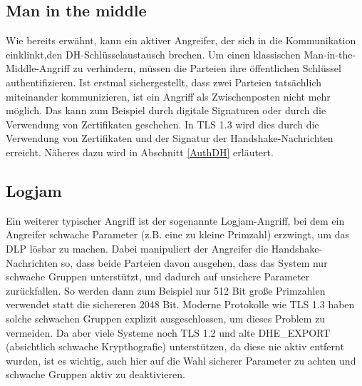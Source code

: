 \documentclass[conference]{IEEEtran}
\begin{document}
\subsection{Man in the middle}
Wie bereits erwähnt, kann ein aktiver Angreifer, der sich in die Kommunikation einklinkt,den DH-Schlüsselaustausch brechen. Um einen klassischen Man-in-the-Middle-Angriff zu verhindern, müssen die Parteien ihre öffentlichen Schlüssel authentifizieren. Ist erstmal sichergestellt, dass zwei Parteien tatsächlich miteinander kommunizieren, ist ein Angriff als Zwischenposten nicht mehr möglich. Das kann zum Beispiel durch digitale Signaturen oder durch die Verwendung von Zertifikaten geschehen. In TLS 1.3 wird dies durch die Verwendung von Zertifikaten und der Signatur der Handshake-Nachrichten erreicht.\cite[§4.4.2, §4.4.3]{rfc8446} Näheres dazu wird in Abschnitt \ref{AuthDH} erläutert.

\subsection{Logjam}
Ein weiterer typischer Angriff ist der sogenannte Logjam-Angriff, bei dem ein Angreifer schwache Parameter (z.B. eine zu kleine Primzahl) erzwingt, um das DLP lösbar zu machen. Dabei manipuliert der Angreifer die Handshake-Nachrichten so, dass beide Parteien davon ausgehen, dass das System nur schwache Gruppen unterstützt, und dadurch auf unsichere Parameter zurückfallen. So werden dann zum Beispiel nur 512 Bit große Primzahlen verwendet statt die sichereren 2048 Bit.\cite{logjam} Moderne Protokolle wie TLS 1.3 haben solche schwachen Gruppen explizit ausgeschlossen, um dieses Problem zu vermeiden.\cite[§1.2]{rfc8446} Da aber viele Systeme noch TLS 1.2 und alte DHE\_EXPORT (absichtlich schwache Krypthografie) unterstützen, da diese nie aktiv entfernt wurden, ist es wichtig, auch hier auf die Wahl sicherer Parameter zu achten und schwache Gruppen aktiv zu deaktivieren.\cite{logjam, rfc7919}
\end{document}
